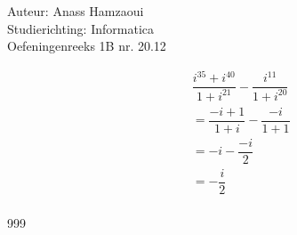 \documentclass[a4paper]{article}
\begin{document}
  
\noindent \large Auteur: Anass Hamzaoui \\
\noindent \large Studierichting: Informatica\\
\noindent \large Oefeningenreeks 1B nr. 20.12\\  

\medskip

\normalsize

\begin{eqnarray*}
    && \dfrac{i^{35} + i^{40}}{1 + i^{21}} - \dfrac{i^{11}}{1 + i^{20}} \\
    && = \dfrac{-i + 1}{1 + i} - \dfrac{-i}{1 + 1} \\
    && = -i - \dfrac{-i}{2} \\
    && = -\dfrac{i}{2} \\
\end{eqnarray*}

\begin{thebibliography}{999}
\end{thebibliography}
\end{document}
